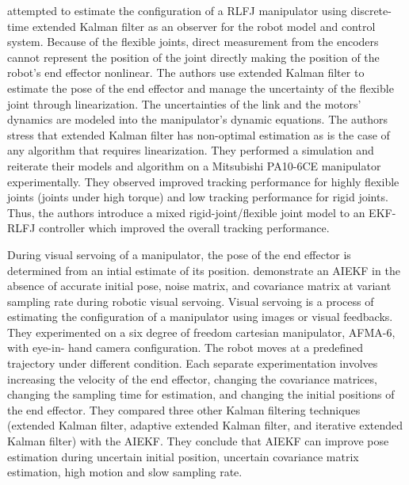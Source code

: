 \textcite{Lightcap2010} attempted to estimate the configuration of a
\acrfull{RLFJ} manipulator using discrete-time extended Kalman filter as 
an observer for the robot
model and control system. Because of the flexible joints, 
direct measurement from the encoders
cannot represent the position of the joint directly making the 
position of the robot’s end effector
nonlinear. The authors use extended Kalman filter to estimate the 
pose of the end effector and
manage the uncertainty of the flexible joint through linearization. 
The uncertainties of the link
and the motors' dynamics are modeled into the manipulator's dynamic 
equations. The authors
stress that extended Kalman filter has non-optimal estimation as is the 
case of any algorithm
that requires linearization. They performed a simulation and reiterate 
their models and algorithm
on a Mitsubishi PA10-6CE manipulator experimentally. 
They observed improved tracking
performance for highly flexible joints (joints under high torque) 
and low tracking performance for
rigid joints. 
Thus, the authors introduce a mixed rigid-joint/flexible joint 
model to an \acrfull{EKF-RLFJ}
controller which improved the overall tracking performance.

During visual servoing of a manipulator, the pose of the 
end effector is determined from
an intial estimate of its position. \textcite{Janabi-Sharifi2010} 
demonstrate an \acrfull{AIEKF} in the absence of accurate 
initial pose, noise matrix,
and covariance matrix at variant sampling rate during robotic visual 
servoing. Visual servoing is
a process of estimating the configuration of a manipulator using images 
or visual feedbacks.
They experimented on a six degree of freedom cartesian manipulator, 
AFMA-6, with eye-in-
hand camera configuration. 
The robot moves at a predefined trajectory under different condition.
Each separate experimentation involves increasing the velocity of 
the end effector, changing the
covariance matrices, changing the sampling time for estimation, 
and changing the initial
positions of the end effector. 
They compared three other Kalman filtering techniques (extended
Kalman filter, adaptive extended Kalman filter, and iterative 
extended Kalman filter) with the
AIEKF. They conclude that AIEKF can improve pose estimation during 
uncertain initial position,
uncertain covariance matrix estimation, high motion and slow sampling rate.

